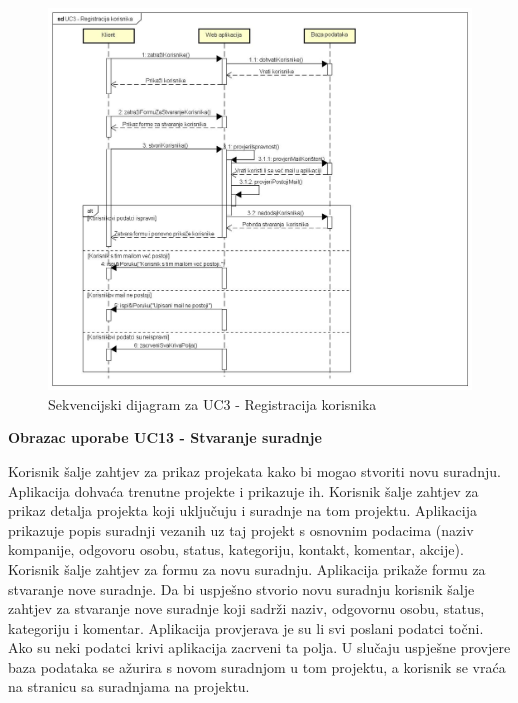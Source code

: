 				\begin{figure}[H]
					\includegraphics[scale=0.3]{slike/Sekvencijski dijagrami/UC3 - Registracija korisnika}
					\centering
					\caption{Sekvencijski dijagram za UC3 - Registracija korisnika}
					\label{fig:UC3}
				\end{figure}

				\textbf{Obrazac uporabe UC13 - Stvaranje suradnje}\vspace{0.1cm}

				{Korisnik šalje zahtjev za prikaz projekata kako bi mogao stvoriti novu suradnju. Aplikacija dohvaća trenutne projekte i prikazuje ih. Korisnik šalje zahtjev za prikaz detalja projekta koji uključuju i suradnje na tom projektu. Aplikacija prikazuje popis suradnji vezanih uz taj projekt s osnovnim podacima (naziv kompanije, odgovoru osobu, status, kategoriju, kontakt, komentar, akcije). Korisnik šalje zahtjev za formu za novu suradnju.	Aplikacija prikaže formu za stvaranje nove suradnje. Da bi uspješno stvorio novu suradnju korisnik šalje zahtjev za stvaranje nove suradnje koji sadrži naziv, odgovornu osobu, status, kategoriju i komentar. Aplikacija provjerava je su li svi poslani podatci točni. Ako su neki podatci krivi aplikacija zacrveni ta polja. U slučaju uspješne provjere baza podataka se ažurira s novom suradnjom u tom projektu, a korisnik se vraća na stranicu sa suradnjama na projektu.}

